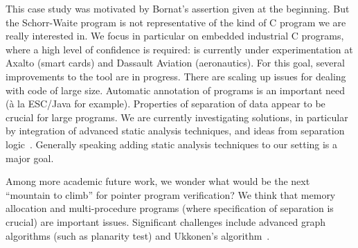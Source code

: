 This case study was motivated by Bornat's assertion given at the
beginning. But the Schorr-Waite program is not representative of the
kind of C program we are really interested in. We focus in particular
on embedded industrial C programs, where a high level of confidence is
required: \caduceus{} is currently under experimentation at Axalto
(smart cards) and Dassault Aviation (aeronautics). For this goal,
several improvements to the \caduceus{} tool are in progress. There
are scaling up issues for dealing with code of large size. Automatic
annotation of programs is an important need (\`a la ESC/Java for
example). Properties of separation of data appear to be crucial for
large programs. We are currently investigating solutions, in
particular by integration of advanced static analysis techniques, and
ideas from separation logic~\cite{reynolds02lics}. Generally speaking
adding static analysis techniques to our setting is a major goal.

Among more academic future work, we wonder what would be the next
``mountain to climb'' for pointer program verification? We think that
memory allocation and multi-procedure programs (where specification of
separation is crucial) are important issues. Significant challenges
include advanced graph algorithms (such as planarity test) and
Ukkonen's algorithm~\cite{ukkonen95}.



